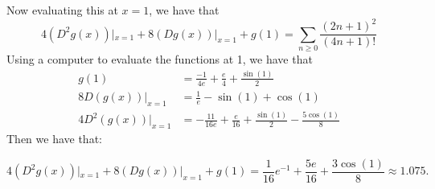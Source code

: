 \documentclass[]{article}
\begin{document}
Now evaluating this at $x = 1$, we have that
\begin{equation}
	4 (D^2 g(x))|_{x = 1} + 8 (D g(x))|_{x = 1} + g(1) = \sum_{n \geq 0}\frac{(2n + 1)^2}{(4n + 1)!}
\end{equation}
Using a computer to evaluate the functions at 1, we have that
\begin{align*}
	g(1) &= \frac{-1}{4e} + \frac{e}{4} + \frac{\sin(1)}{2}\\
	8D(g(x))|_{x = 1} &= \frac{1}{e} - \sin(1) + \cos(1)\\
	4 D^2(g(x))|_{x = 1} &= -\frac{11}{16e} + \frac{e}{16} + \frac{\sin(1)}{2} - \frac{5 \cos(1)}{8}
\end{align*}
Then we have that:

\begin{equation}
	4 (D^2 g(x))|_{x = 1} + 8 (D g(x))|_{x = 1} + g(1) = \frac{1}{16}e^{-1} + \frac{5e}{16} + \frac{3 \cos(1)}{8}\approx 1.075.
\end{equation}
\end{document}
